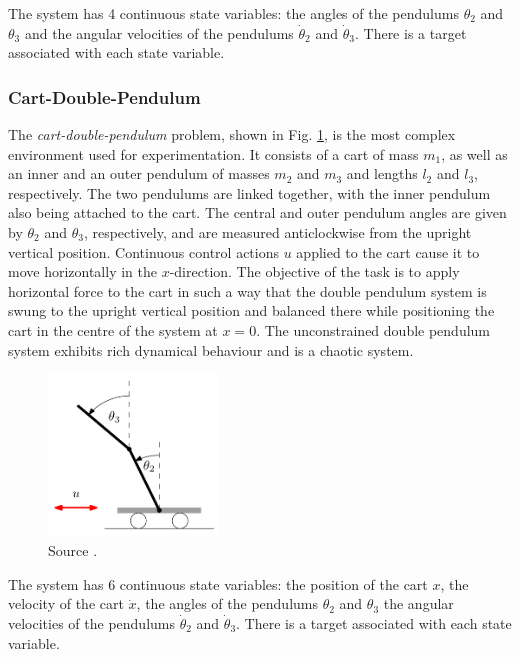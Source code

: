 The system has 4 continuous state variables: the angles of the pendulums $\theta_2$ and $\theta_3$ and the angular velocities of the pendulums $\dot \theta_2$ and $\dot \theta_3$. There is a target associated with each state variable.

\subsubsection{Cart-Double-Pendulum}
The \textit{cart-double-pendulum} problem, shown in Fig. \ref{Fig:cartDoublePendulum-environment}, is the most complex environment used for experimentation. It consists of a cart of mass $m_1$, as well as an inner and an outer pendulum of masses $m_2$ and $m_3$ and lengths $l_2$ and $l_3$, respectively. The two pendulums are linked together, with the inner pendulum also being attached to the cart.  The central and outer pendulum angles are given by $\theta_2$ and $\theta_3$, respectively, and are measured anticlockwise from the upright vertical position. Continuous control actions $u$ applied to the cart cause it to move horizontally in the $x$-direction. The objective of the task is to apply horizontal force to the cart in such a way that the double pendulum system is swung to the upright vertical position and balanced there while positioning the cart in the centre of the system at $x=0$. The unconstrained double pendulum system exhibits rich dynamical behaviour and is a chaotic system.
\begin{figure}[htbp]
\centering    
\includegraphics[width=0.4\textwidth]{Chapter3/Figures/cart-double-pendulum.png}
\caption[Cart-double-pendulum PILCO environment]{Source \cite{deisenroth2013pilco-documentation}.}
\label{Fig:cartDoublePendulum-environment}
\end{figure}

The system has 6 continuous state variables: the position of the cart $x$, the velocity of the cart $\dot x$, the angles of the pendulums $\theta_2$ and $\theta_3$ the angular velocities of the pendulums $\dot \theta_2$ and $\dot \theta_3$. There is a target associated with each state variable.


